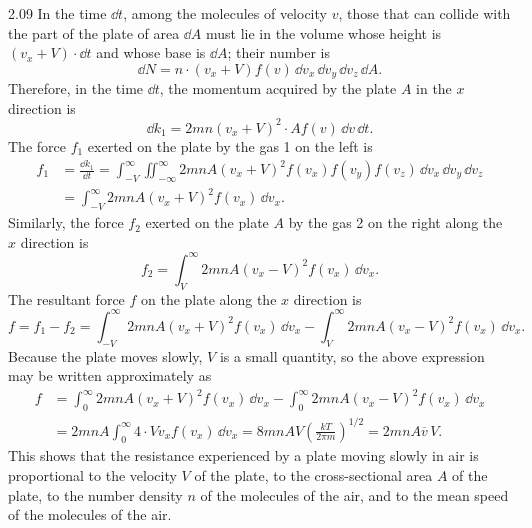 \begin{solution}{2.09}
In the time $\dd t$, among the molecules of velocity $v$, those that can collide with the part of the plate of area $\dd A$ must lie in the volume whose height is $(v_x+V)\cdot\dd t$ and whose base is $\dd A$; their number is
\[
\dd N=n\cdot(v_x+V)f(v)\,\dd v_x\,\dd v_y\,\dd v_z\,\dd A.
\]
Therefore, in the time $\dd t$, the momentum acquired by the plate $A$ in the $x$ direction is
\[
\dd k_1=2mn(v_x+V)^2\cdot A f(v)\,\dd v\,\dd t.
\]
The force $f_1$ exerted on the plate by the gas 1 on the left is
\[
\begin{aligned}
f_1&=\frac{\dd k_1}{\dd t}
=\int_{-V}^{\infty}\iint_{-\infty}^{\infty}2mnA(v_x+V)^2f(v_x)f(v_y)f(v_z)\,\dd v_x\,\dd v_y\,\dd v_z\\
&=\int_{-V}^{\infty}2mnA(v_x+V)^2f(v_x)\,\dd v_x.
\end{aligned}
\]
Similarly, the force $f_2$ exerted on the plate $A$ by the gas 2 on the right along the $x$ direction is
\[
f_2=\int_{V}^{\infty}2mnA(v_x-V)^2f(v_x)\,\dd v_x.
\]
The resultant force $f$ on the plate along the $x$ direction is
\[
f=f_1-f_2=\int_{-V}^{\infty}2mnA(v_x+V)^2f(v_x)\,\dd v_x
-\int_{V}^{\infty}2mnA(v_x-V)^2f(v_x)\,\dd v_x.
\]
Because the plate moves slowly, $V$ is a small quantity, so the above expression may be written approximately as
\[
\begin{aligned}
f&=\int_{0}^{\infty}2mnA(v_x+V)^2f(v_x)\,\dd v_x
-\int_{0}^{\infty}2mnA(v_x-V)^2f(v_x)\,\dd v_x\\
&=2mnA\int_{0}^{\infty}4\cdot Vv_xf(v_x)\,\dd v_x
=8mnAV\left(\frac{kT}{2\pi m}\right)^{1/2}
=2mnA\overline{v}\,V.
\end{aligned}
\]
This shows that the resistance experienced by a plate moving slowly in air is proportional to the velocity $V$ of the plate, to the cross-sectional area $A$ of the plate, to the number density $n$ of the molecules of the air, and to the mean speed of the molecules of the air.
\end{solution}

